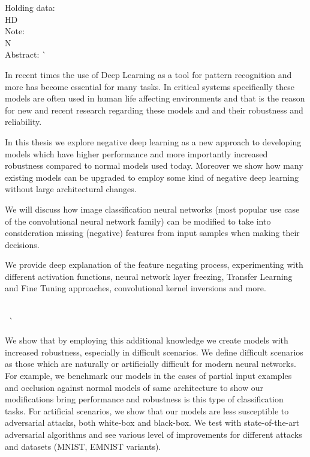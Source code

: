 \begin{tabbing}
  Holding data:            \>                               \\
  HD                       \>                               \\
  Note:                    \>                               \\
  N                        \>                               \\
  Abstract:                \`
  \begin{minipage}[t]{.8\textwidth}
    In recent times the use of Deep Learning as a tool for pattern recognition and more has become essential for many tasks. In critical systems specifically these models are often used in human life affecting environments and that is the reason for new and recent research regarding these models and and their robustness and reliability. 

In this thesis we explore negative deep learning as a new approach to developing models which have higher performance and more importantly increased robustness compared to normal models used today. Moreover we show how many existing models can be upgraded to employ some kind of negative deep learning without large architectural changes.

We will discuss how image classification neural networks (most popular use case of the convolutional neural network family) can be modified to take into consideration missing (negative) features from input samples when making their decisions. 

We provide deep explanation of the feature negating process, experimenting with different activation functions, neural network layer freezing, Transfer Learning and Fine Tuning approaches, convolutional kernel inversions and more.
\end{minipage}\\
\  \`
\begin{minipage}[t]{.8\textwidth}
  We show that by employing this additional knowledge we create models with increased robustness, especially in difficult scenarios. We define difficult scenarios as those which are naturally or artificially difficult for modern neural networks. For example, we benchmark our models in the cases of partial input examples and occlusion against normal models of same architecture to show our modifications bring performance and robustness is this type of classification tasks. For artificial scenarios, we show that our models are less susceptible to adversarial attacks, both white-box and black-box. We test with state-of-the-art adversarial algorithms and see various level of improvements for different attacks and datasets (MNIST, EMNIST variants).


\end{minipage}
\end{tabbing}

